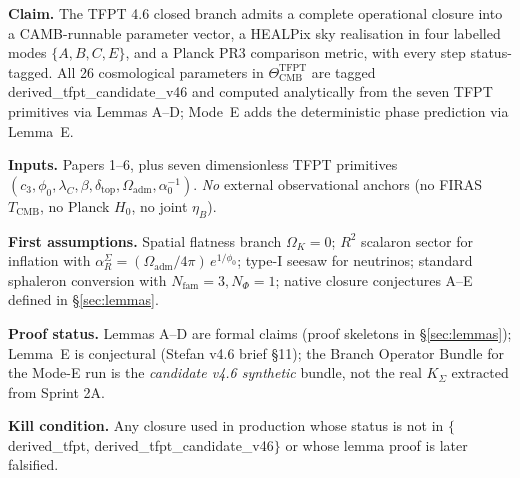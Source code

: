 \documentclass[11pt,a4paper]{article}
\begin{document}
\begin{tfptclaimcontract}
\textbf{Claim.} The TFPT 4.6 closed branch admits a complete
operational closure into a CAMB-runnable parameter vector, a HEALPix
sky realisation in four labelled modes \(\{A,B,C,E\}\), and a Planck
PR3 comparison metric, with every step status-tagged.  All 26
cosmological parameters in
\(\Theta_{\mathrm{CMB}}^{\mathrm{TFPT}}\) are tagged
\textsf{derived\_tfpt\_candidate\_v46} and computed analytically from
the seven TFPT primitives via Lemmas A--D; Mode~E adds the
deterministic phase prediction via Lemma~E.
\par
\textbf{Inputs.} Papers 1--6, plus seven dimensionless TFPT primitives
\((c_3,\phi_0,\lambda_C,\beta,\delta_{\mathrm{top}},
\Omega_{\mathrm{adm}},\alpha_0^{-1})\). \emph{No} external observational
anchors (no FIRAS \(T_{\mathrm{CMB}}\), no Planck \(H_0\), no joint
\(\eta_B\)).
\par
\textbf{First assumptions.} Spatial flatness branch \(\Omega_K=0\);
\(R^2\) scalaron sector for inflation with
\(\alpha_R^\Sigma=(\Omega_{\mathrm{adm}}/4\pi)\,e^{1/\phi_0}\);
type-I seesaw for neutrinos; standard sphaleron conversion with
\(N_{\mathrm{fam}}=3,N_\Phi=1\); native closure conjectures A--E
defined in \S\ref{sec:lemmas}.
\par
\textbf{Proof status.} Lemmas A--D are formal claims (proof skeletons
in \S\ref{sec:lemmas}); Lemma~E is conjectural (Stefan v4.6 brief
\S11); the Branch Operator Bundle for the Mode-E run is the
\emph{candidate v4.6 synthetic} bundle, not the real
\(K_\Sigma\) extracted from Sprint 2A.
\par
\textbf{Kill condition.} Any closure used in production whose status
is not in \(\{\)\textsf{derived\_tfpt}, \textsf{derived\_tfpt\_candidate\_v46}\(\}\)
or whose lemma proof is later falsified.
\par
\end{tfptclaimcontract}
\end{document}
